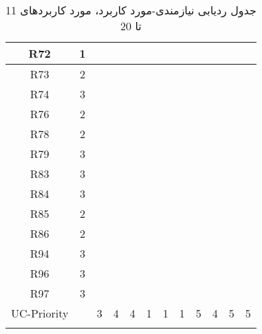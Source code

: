 \documentclass[12pt]{article}
\begin{document}
\begin{longtable}{|c|c|c|c|c|c|c|c|c|c|c|c|}
	\hline
	R72         & 1          &           &           &           &           &           &           &           &           &           &           \\
	\hline
	R73         & 2          &           &           &           &           &           &           &           &           &           &           \\
	\hline
	R74         & 3          &           &           &           &           &           &           &           &           &           &           \\
	\hline
	R76         & 2          &           &           &           &           &           &           &           &           &           &           \\
	\hline
	R78         & 2          & \ding{51} &           &           &           &           &           &           &           &           &           \\
	\hline
	R79         & 3          &           &           &           &           &           &           &           &           &           &           \\
	\hline
	R83         & 3          &           &           &           &           &           &           &           &           &           &           \\
	\hline
	R84         & 3          &           &           &           &           &           &           &           &           &           &           \\
	\hline
	R85         & 2          &           &           &           &           &           &           &           &           &           &           \\
	\hline
	R86         & 2          &           &           &           &           &           &           &           &           &           &           \\
	\hline
	R94         & 3          &           &           &           &           &           &           &           &           &           &           \\
	\hline
	R96         & 3          &           &           &           &           &           &           &           &           &           &           \\
	\hline
	R97         & 3          &           &           &           &           &           &           &           &           &           &           \\
	\hline
	UC-Priority &            & 3         & 4         & 4         & 1         & 1         & 1         & 5         & 4         & 5         & 5         \\
	\hline
	\caption{جدول ردیابی نیازمندی-مورد کاربرد، مورد کاربردهای 11 تا 20}
\end{longtable}
\end{document}
